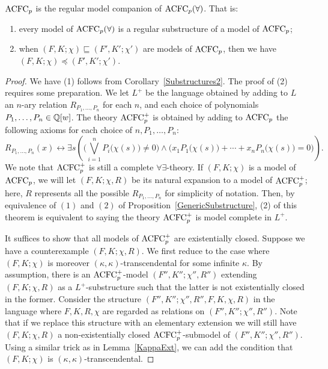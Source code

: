 \begin{thm} \label{ElSub2}
\(\mathrm{ACFC}_p \) is the regular model companion of \( \mathrm{ACFC}_p(\forall) \). That is:
\begin{enumerate}
\item every model of \( \mathrm{ACFC}_p(\forall) \) is a regular substructure of a model of \( \mathrm{ACFC}_p \);
\item when $(F, K; \chi) \sqsubseteq (F',K';\chi')$ are models of $\mathrm{ACFC}_p$, then we have $(F, K; \chi) \preccurlyeq (F',K';\chi')$.
\end{enumerate}
\end{thm}


\begin{proof}

We have (1) follows from Corollary~\ref{Substructures2}. The proof of (2) requires some preparation. We let $L^{+}$ be the language obtained by adding to $L$ an $n$-ary relation $R_{P_1,\ldots, P_n}$ for each $n$, and each choice of polynomials $P_1, \ldots, P_n \in \mathbb{Q}[w]$. The theory $\mathrm{ACFC}_p^+$ is obtained by adding to $\mathrm{ACFC}_p$ the following axioms for each choice of $n,P_1, \ldots, P_n$:
$$R_{P_1,\ldots, P_n}(x)\leftrightarrow \exists s \left( \Big( \bigvee_{i=1}^n P_i \big(\chi(s)\big) \neq 0\Big) \wedge \Big( x_1 P_1 \big(\chi(s) \big) + \cdots+ x_n P_n \big(\chi(s) \big) =0 \Big)  \right). $$ 
We note that $\mathrm{ACFC}_p^+$ is still a complete $\forall\exists$-theory. If $(F, K ; \chi)$ is a model of $\mathrm{ACFC}_p$, we will let $(F, K ; \chi, R)$ be its natural expansion to a model of $\mathrm{ACFC}_p^+$; here, $R$ represents all the possible $R_{P_1,\ldots, P_n}$ for simplicity of notation. Then, by equivalence of $(1)$ and $(2)$ of Proposition~\ref{GenericSubstructure}, (2) of this theorem is equivalent to saying the theory $\mathrm{ACFC}_p^+$ is model complete in $L^+$. 

It suffices to show that all models of $\mathrm{ACFC}_p^+$ are existentially closed. Suppose we have a counterexample $ (F, K; \chi, R)$. We first reduce to the case where $ (F, K; \chi)$ is moreover $(\kappa, \kappa)$-transcendental for some infinite $\kappa$. By assumption, there is an $\mathrm{ACFC}_p^+$-model $(F'', K''; \chi'', R'')$ extending $ (F, K; \chi, R)$ as a $L^+$-substructure such that the latter is not existentially closed in the former. Consider the structure $(F'', K''; \chi'', R'', F, K, \chi, R)$ in the language where $F, K, R, \chi$ are regarded as relations on $(F'', K''; \chi'', R'')$.
Note that if we replace this structure with an elementary extension we will still have $ (F, K; \chi, R)$ a non-existentially closed $\mathrm{ACFC}_p^+$-submodel of $ (F'', K''; \chi'', R'')$. Using a similar trick as in Lemma~\ref{KappaExt}, we can add the condition that $ (F, K; \chi)$ is $(\kappa, \kappa)$-transcendental.


\end{proof}
